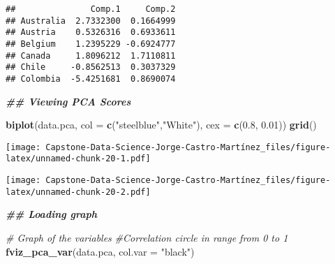 \documentclass[
]{article}
\newenvironment{Shaded}{\begin{snugshade}}{\end{snugshade}}
\newcommand{\AttributeTok}[1]{\textcolor[rgb]{0.13,0.29,0.53}{#1}}
\newcommand{\CommentTok}[1]{\textcolor[rgb]{0.56,0.35,0.01}{\textit{#1}}}
\newcommand{\DecValTok}[1]{\textcolor[rgb]{0.00,0.00,0.81}{#1}}
\newcommand{\DocumentationTok}[1]{\textcolor[rgb]{0.56,0.35,0.01}{\textbf{\textit{#1}}}}
\newcommand{\FloatTok}[1]{\textcolor[rgb]{0.00,0.00,0.81}{#1}}
\newcommand{\FunctionTok}[1]{\textcolor[rgb]{0.13,0.29,0.53}{\textbf{#1}}}
\newcommand{\NormalTok}[1]{#1}
\newcommand{\OtherTok}[1]{\textcolor[rgb]{0.56,0.35,0.01}{#1}}
\newcommand{\SpecialCharTok}[1]{\textcolor[rgb]{0.81,0.36,0.00}{\textbf{#1}}}
\newcommand{\StringTok}[1]{\textcolor[rgb]{0.31,0.60,0.02}{#1}}
\begin{document}
\begin{verbatim}
##               Comp.1     Comp.2
## Australia  2.7332300  0.1664999
## Austria    0.5326316  0.6933611
## Belgium    1.2395229 -0.6924777
## Canada     1.8096212  1.7110811
## Chile     -0.8562513  0.3037329
## Colombia  -5.4251681  0.8690074
\end{verbatim}

\begin{Shaded}
\begin{Highlighting}[]
\DocumentationTok{\#\# Viewing PCA Scores}

\FunctionTok{biplot}\NormalTok{(data.pca, }\AttributeTok{col =} \FunctionTok{c}\NormalTok{(}\StringTok{"steelblue"}\NormalTok{,}\StringTok{"White"}\NormalTok{), }\AttributeTok{cex =} \FunctionTok{c}\NormalTok{(}\FloatTok{0.8}\NormalTok{, }\FloatTok{0.01}\NormalTok{))}
\FunctionTok{grid}\NormalTok{()}
\end{Highlighting}
\end{Shaded}

\texttt{[image: Capstone-Data-Science-Jorge-Castro-Martínez\_files/figure-latex/unnamed-chunk-20-1.pdf]}

\begin{Shaded}
\end{Shaded}

\texttt{[image: Capstone-Data-Science-Jorge-Castro-Martínez\_files/figure-latex/unnamed-chunk-20-2.pdf]}

\begin{Shaded}
\begin{Highlighting}[]
\DocumentationTok{\#\# Loading graph}

\CommentTok{\# Graph of the variables}
\CommentTok{\#Correlation circle in range from 0 to 1}
\FunctionTok{fviz\_pca\_var}\NormalTok{(data.pca, }\AttributeTok{col.var =} \StringTok{"black"}\NormalTok{)}
\end{Highlighting}
\end{Shaded}
\end{document}
